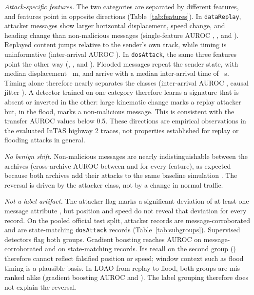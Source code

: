 \documentclass[preprint,12pt,numafflabel]{elsarticle}
\begin{document}
\emph{Attack-specific features.} The two categories are separated by different features, and \ResFeatReversedCount{} features point in opposite directions (Table~\ref{tab:features}). In \texttt{dataReplay}, attacker messages show larger horizontal displacement, speed change, and heading change than non-malicious messages (single-feature AUROC \ResFeatDispReplayAUROC, \ResFeatSpeedChangeReplayAUROC, and \ResFeatHeadingReplayAUROC). Replayed content jumps relative to the sender's own track, while timing is uninformative (inter-arrival AUROC \ResFeatDeltaTReplayAUROC). In \texttt{dosAttack}, the same three features point the other way (\ResFeatDispDoSAUROC, \ResFeatSpeedChangeDoSAUROC, and \ResFeatHeadingDoSAUROC). Flooded messages repeat the sender state, with median displacement \ResFeatDispDoSAttMedian{}~m, and arrive with a median inter-arrival time of \ResFeatDeltaTDoSAttMedian{}~s. Timing alone therefore nearly separates the classes (inter-arrival AUROC \ResFeatDeltaTDoSAUROC, causal jitter \ResFeatJitterDoSAUROC). A detector trained on one category therefore learns a signature that is absent or inverted in the other: large kinematic change marks a replay attacker but, in the flood, marks a non-malicious message. This is consistent with the transfer AUROC values below 0.5. These directions are empirical observations in the evaluated InTAS highway 2 traces, not properties established for replay or flooding attacks in general.

\emph{No benign shift.} Non-malicious messages are nearly indistinguishable between the archives (cross-archive AUROC between \ResFeatBenignShiftMin{} and \ResFeatBenignShiftMax{} for every feature), as expected because both archives add their attacks to the same baseline simulation \cite{hermann2026veremi}. The reversal is driven by the attacker class, not by a change in normal traffic.

\emph{Not a label artifact.} The attacker flag marks a significant deviation of at least one message attribute \cite{hermann2026veremi}, but position and speed do not reveal that deviation for every record. On the pooled official test split, \ResLblPooledMsgCount{} attacker records are message-corroborated and \ResLblPooledSenderLevelCount{} are state-matching \texttt{dosAttack} records (Table~\ref{tab:subgroups}). Supervised detectors flag both groups. Gradient boosting reaches AUROC \ResLblPooledHGBMsgAUROC{} on message-corroborated and \ResLblPooledHGBSenderLevelAUROC{} on state-matching records. Its recall on the second group (\ResLblPooledHGBSenderLevelRecall) therefore cannot reflect falsified position or speed; window context such as flood timing is a plausible basis. In LOAO from replay to flood, both groups are mis-ranked alike (gradient boosting AUROC \ResLblLOAOReplayToDoSHGBMsgAUROC{} and \ResLblLOAOReplayToDoSHGBSenderLevelAUROC). The label grouping therefore does not explain the reversal.
\end{document}
